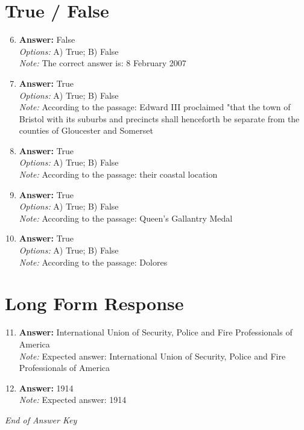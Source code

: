 \documentclass[12pt]{article}
\begin{document}
\section*{True / False}
\begin{enumerate}[label=\arabic*.]
\setcounter{enumi}{5}
\item \textbf{Answer:} False
\\ \textit{Options:} A) True; B) False
\\ \textit{Note:} The correct answer is: 8 February 2007
\item \textbf{Answer:} True
\\ \textit{Options:} A) True; B) False
\\ \textit{Note:} According to the passage: Edward III proclaimed "that the town of Bristol with its suburbs and precincts shall henceforth be separate from the counties of Gloucester and Somerset
\item \textbf{Answer:} True
\\ \textit{Options:} A) True; B) False
\\ \textit{Note:} According to the passage: their coastal location
\item \textbf{Answer:} True
\\ \textit{Options:} A) True; B) False
\\ \textit{Note:} According to the passage: Queen's Gallantry Medal
\item \textbf{Answer:} True
\\ \textit{Options:} A) True; B) False
\\ \textit{Note:} According to the passage: Dolores
\end{enumerate}

\section*{Long Form Response}
\begin{enumerate}[label=\arabic*.]
\setcounter{enumi}{10}
\item \textbf{Answer:} International Union of Security, Police and Fire Professionals of America
\\ \textit{Note:} Expected answer: International Union of Security, Police and Fire Professionals of America
\item \textbf{Answer:} 1914
\\ \textit{Note:} Expected answer: 1914
\end{enumerate}

\vfill
\noindent\textit{End of Answer Key}
\end{document}
